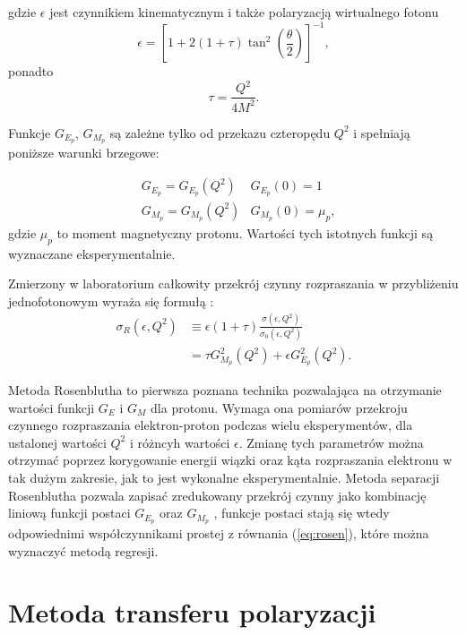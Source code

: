 \documentclass[11pt]{book}
\theoremstyle{definition}
\begin{document}
gdzie $\epsilon$ jest czynnikiem kinematycznym i także polaryzacją wirtualnego fotonu
$$\epsilon = \left[ 1 + 2(1 + \tau) \tan^2 \left(\frac{\theta}{2}\right) \right]^{-1},$$
ponadto $$\tau = \frac{Q^2}{4M^2}.$$

Funkcje $G_{E_p}$, $ G_{M_p}$ są zależne tylko od przekazu czteropędu $Q^2$ i spełniają poniższe warunki brzegowe:

\begin{eqnarray}
	&G_{E_p} = G_{E_p}(Q^2)  &G_{E_p}(0) = 1\\
	&G_{M_p} = G_{M_p}(Q^2)  &G_{M_p}(0) = \mu_p, \nonumber \label{eq:constraints}
\end{eqnarray}
gdzie $\mu_p$ to moment magnetyczny protonu. Wartości tych istotnych funkcji są wyznaczane eksperymentalnie. 

Zmierzony w laboratorium całkowity przekrój czynny rozpraszania w przybliżeniu jednofotonowym wyraża się formułą \cite{2009PhRvC..79f5204A}:
% 
\begin{equation}
\begin{split}
\sigma_R(\epsilon, Q^2) &\equiv \epsilon \left(1 + \tau \right) \frac{\sigma \left(\epsilon,Q^2\right)}{\sigma_0\left(\epsilon, Q^2\right) }\\
&=\tau G_{M_p}^2(Q^2) + \epsilon G_{E_p}^2(Q^2).
\end{split} \label{eq:rosen}
\end{equation}

Metoda Rosenblutha to pierwsza poznana technika pozwalająca na otrzymanie wartości funkcji $G_E$ i $G_M$ dla protonu. Wymaga ona pomiarów przekroju czynnego rozpraszania elektron-proton podczas wielu eksperymentów, dla ustalonej wartości $Q^2$ i różncyh wartości $\epsilon$. Zmianę tych parametrów można otrzymać poprzez korygowanie energii wiązki oraz kąta rozpraszania elektronu w tak dużym zakresie, jak to jest wykonalne eksperymentalnie. Metoda separacji Rosenblutha pozwala zapisać zredukowany przekrój czynny jako kombinację liniową funkcji postaci $G_{E_p}$ oraz $G_{M_p}$ \cite{2007PrPNP..59..694P}, funkcje postaci stają się wtedy odpowiednimi współczynnikami prostej z równania (\ref{eq:rosen}), które można wyznaczyć metodą regresji.
%


\section{Metoda transferu polaryzacji}
\end{document}
